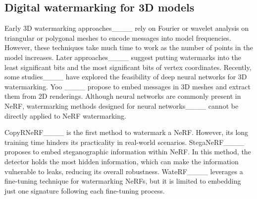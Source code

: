 \subsection{Digital watermarking for 3D models}
Early 3D watermarking approaches____ rely on Fourier or wavelet analysis on triangular or polygonal meshes to encode messages into model frequencies. However, these techniques take much time to work as the number of points in the model increases. Later approaches____ suggest putting watermarks into the least significant bits and the most significant bits of vertex coordinates. Recently, some studies____ have explored the feasibility of deep neural networks for 3D watermarking. Yoo \etal____ propose to embed messages in 3D meshes and extract them from 2D renderings. Although neural networks are commonly present in NeRF, watermarking methods designed for neural networks____ cannot be directly applied to NeRF watermarking.

CopyRNeRF____ is the first method to watermark a NeRF. However, its long training time hinders its practicality in real-world scenarios. StegaNeRF____ proposes to embed steganographic information within NeRF. In this method, the detector holds the most hidden information, which can make the information vulnerable to leaks, reducing its overall robustness. WateRF____ leverages a fine-tuning technique for watermarking NeRFs, but it is limited to embedding just one signature following each fine-tuning process.
